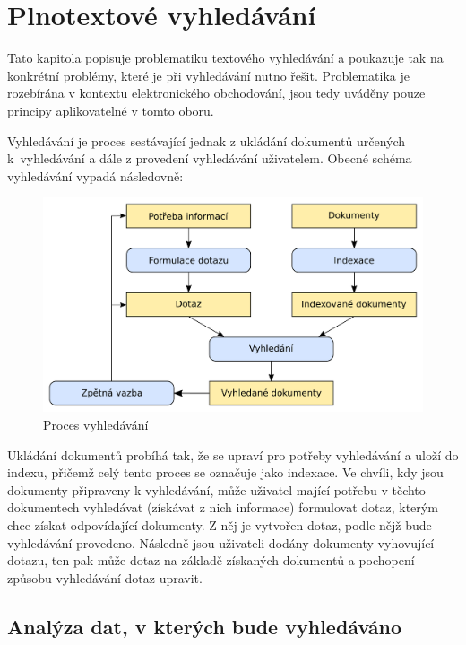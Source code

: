 \documentclass[FM,DP]{tulthesis}
\begin{document}
\chapter{Plnotextové vyhledávání}

Tato kapitola popisuje problematiku textového vyhledávání a poukazuje tak na konkrétní
problémy, které je při vyhledávání nutno řešit. Problematika je rozebírána v kontextu
elektronického obchodování, jsou tedy uváděny pouze principy aplikovatelné v tomto
oboru.

Vyhledávání je proces sestávající jednak z ukládání dokumentů určených k~vyhledávání
a dále z provedení vyhledávání uživatelem. Obecné schéma vyhledávání vypadá následovně:

\begin{figure}[h]
\center
\includegraphics[width=\textwidth]{schema-vyhledavani.pdf}
\caption{Proces vyhledávání}
\label{schema-vyhledavani}
\end{figure}

Ukládání dokumentů probíhá tak, že se upraví pro potřeby vyhledávání a uloží 
do indexu, přičemž celý tento proces se označuje jako indexace. Ve chvíli, kdy jsou
dokumenty připraveny k vyhledávání, může uživatel mající potřebu v těchto dokumentech 
vyhledávat (získávat z nich informace) formulovat dotaz, kterým chce získat odpovídající
dokumenty. Z něj je vytvořen dotaz, podle nějž bude vyhledávání provedeno. Následně
jsou uživateli dodány dokumenty vyhovující dotazu, ten pak může dotaz na základě
získaných dokumentů a pochopení způsobu vyhledávání dotaz upravit.

\section{Analýza dat, v kterých bude vyhledáváno}
\end{document}
